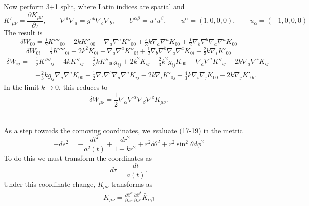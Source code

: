 \documentclass[10pt,letterpaper]{article}
\begin{document}
Now perform 3+1 split, where Latin indices are spatial and 
\begin{equation}
	K'_{\mu\nu} = \frac{\partial K_{\mu\nu}}{\partial \tau},\qquad \nabla^a\nabla_a = g^{ab}\nabla_a\nabla_b,\qquad
	 U^{\alpha\beta} = u^\alpha u^\beta,\qquad u^\alpha = (1,0,0,0),\qquad u_\alpha = (-1,0,0,0)
\end{equation}
The result is
\begin{equation}
\delta W_{00}=\tfrac{1}{2} K''''_{00} - 2 k K''_{00} -  \nabla_{a}\nabla^{a}K''_{00} + \tfrac{4}{3} k \nabla_{a}\nabla^{a}K_{00} + \tfrac{1}{2} \nabla_{b}\nabla^{b}\nabla_{a}\nabla^{a}K_{00}
\end{equation}
\begin{equation}
\delta W_{0i}=\tfrac{1}{2} K''''_{0i} - 2 k^2 K_{0i} -  \nabla_{a}\nabla^{a}K''_{0i} + \tfrac{1}{2} \nabla_{b}\nabla^{b}\nabla_{a}\nabla^{a}K_{0i} -  \tfrac{2}{3} k \nabla_{i}K'_{00}
\end{equation}
\begin{align}
\delta W_{ij}={}&\tfrac{1}{2} K''''_{ij}
 + 4 k K''_{ij}
 -  \tfrac{2}{3} k K''_{00} g_{ij}
 + 2 k^2 K_{ij}
 -  \tfrac{2}{3} k^2 g_{ij} K_{00}
 -  \nabla_{a}\nabla^{a}K''_{ij}
 - 2 k \nabla_{a}\nabla^{a}K_{ij}\nonumber\\
& + \tfrac{2}{3} k g_{ij} \nabla_{a}\nabla^{a}K_{00}
 + \tfrac{1}{2} \nabla_{b}\nabla^{b}\nabla_{a}\nabla^{a}K_{ij}
 - 2 k \nabla_{i}K'_{0j}
 + \tfrac{4}{3} k \nabla_{i}\nabla_{j}K_{00}
 - 2 k \nabla_{j}K'_{0i}.
\end{align}
In the limit $k\to0$, this reduces to 
\begin{equation}
\delta W_{\mu\nu} = \frac12 \nabla_\alpha \nabla^\alpha \nabla_\beta \nabla^\beta K_{\mu\nu}.
\end{equation}
\\ \\
As a step towards the comoving coordinates, we evaluate (17-19) in the metric
\begin{equation}
	-ds^2 = -\frac{dt^2}{a^2(t)} + \frac{dr^2}{1-kr^2}+ r^2d\theta^2 + r^2\sin^2\theta d\phi^2
\end{equation}
To do this we must transform the coordinates as
\begin{equation}
	d\tau = \frac{dt}{a(t)}.
\end{equation}
Under this coordinate change, $K_{\mu\nu}$ transforms as 
\begin{align}
	K_{\mu\nu} = \frac{\partial \bar x^\alpha}{\partial x^\mu}\frac{\partial \bar x^\beta}{\partial x^\nu}\bar K_{\alpha\beta}
\end{align}
\end{document}
